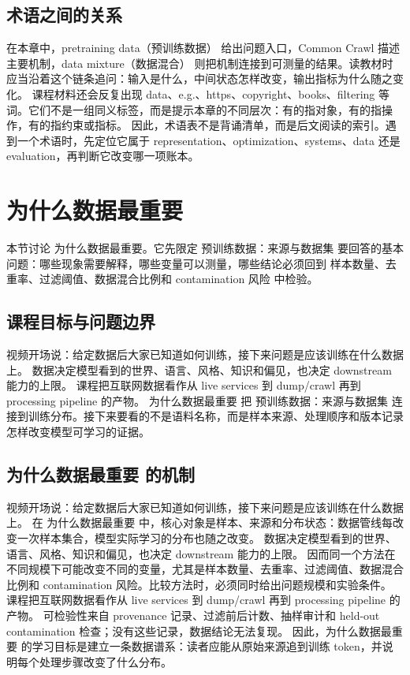 \documentclass[a4paper]{article}
\begin{document}
\subsection{术语之间的关系}
在本章中，pretraining data（预训练数据） 给出问题入口，Common Crawl 描述主要机制，data mixture（数据混合） 则把机制连接到可测量的结果。读教材时应当沿着这个链条追问：输入是什么，中间状态怎样改变，输出指标为什么随之变化。
课程材料还会反复出现 data、e.g.、https、copyright、books、filtering 等词。它们不是一组同义标签，而是提示本章的不同层次：有的指对象，有的指操作，有的指约束或指标。
因此，术语表不是背诵清单，而是后文阅读的索引。遇到一个术语时，先定位它属于 representation、optimization、systems、data 还是 evaluation，再判断它改变哪一项账本。
\section{为什么数据最重要}
本节讨论 为什么数据最重要。它先限定 预训练数据：来源与数据集 要回答的基本问题：哪些现象需要解释，哪些变量可以测量，哪些结论必须回到 样本数量、去重率、过滤阈值、数据混合比例和 contamination 风险 中检验。
\subsection{课程目标与问题边界}
视频开场说：给定数据后大家已知道如何训练，接下来问题是应该训练在什么数据上。
数据决定模型看到的世界、语言、风格、知识和偏见，也决定 downstream 能力的上限。
课程把互联网数据看作从 live services 到 dump/crawl 再到 processing pipeline 的产物。
为什么数据最重要 把 预训练数据：来源与数据集 连接到训练分布。接下来要看的不是语料名称，而是样本来源、处理顺序和版本记录怎样改变模型可学习的证据。
\subsection{为什么数据最重要 的机制}
视频开场说：给定数据后大家已知道如何训练，接下来问题是应该训练在什么数据上。 在 为什么数据最重要 中，核心对象是样本、来源和分布状态：数据管线每改变一次样本集合，模型实际学习的分布也随之改变。
数据决定模型看到的世界、语言、风格、知识和偏见，也决定 downstream 能力的上限。 因而同一个方法在不同规模下可能改变不同的变量，尤其是样本数量、去重率、过滤阈值、数据混合比例和 contamination 风险。比较方法时，必须同时给出问题规模和实验条件。
课程把互联网数据看作从 live services 到 dump/crawl 再到 processing pipeline 的产物。 可检验性来自 provenance 记录、过滤前后计数、抽样审计和 held-out contamination 检查；没有这些记录，数据结论无法复现。
因此，为什么数据最重要 的学习目标是建立一条数据谱系：读者应能从原始来源追到训练 token，并说明每个处理步骤改变了什么分布。
\end{document}
